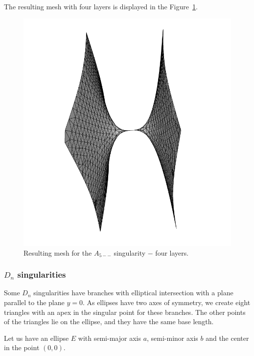 The resulting mesh with four layers is displayed in the
Figure~\ref{img:A5-uniform-layers}.
\begin{figure}
    \centerline{\includegraphics[scale=0.25]{images/A5-uniform-layers}}
    \caption[Resulting mesh for the $A_{5--}$ singularity]
    {Resulting mesh for the $A_{5--}$ singularity $-$ four layers.}
    \label{img:A5-uniform-layers}
\end{figure}

\subsubsection*{$D_n$ singularities}
Some $D_n$ singularities have branches with elliptical intersection with 
a plane parallel to the plane $y=0$. As ellipses have two axes of symmetry,
we create eight triangles with an apex in the singular point for these branches.
The other points of the triangles lie on the ellipse, and they have the same base length.

Let us have an ellipse $E$ with semi-major axis $a$, semi-minor axis $b$ 
and the center in the point $(0, 0)$.

